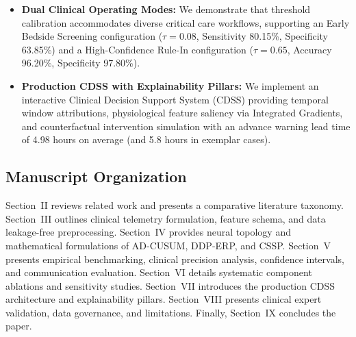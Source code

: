 \documentclass[journal,twocolumn,10pt]{IEEEtran}
\begin{document}
\begin{itemize}
\item \textbf{Dual Clinical Operating Modes:} We demonstrate that threshold calibration accommodates diverse critical care workflows, supporting an Early Bedside Screening configuration ($\tau=0.08$, Sensitivity 80.15\%, Specificity 63.85\%) and a High-Confidence Rule-In configuration ($\tau=0.65$, Accuracy 96.20\%, Specificity 97.80\%).
    \item \textbf{Production CDSS with Explainability Pillars:} We implement an interactive Clinical Decision Support System (CDSS) providing temporal window attributions, physiological feature saliency via Integrated Gradients, and counterfactual intervention simulation with an advance warning lead time of 4.98 hours on average (and 5.8 hours in exemplar cases).
\end{itemize}

\subsection{Manuscript Organization}
Section~II reviews related work and presents a comparative literature taxonomy. Section~III outlines clinical telemetry formulation, feature schema, and data leakage-free preprocessing. Section~IV provides neural topology and mathematical formulations of AD-CUSUM, DDP-ERP, and CSSP. Section~V presents empirical benchmarking, clinical precision analysis, confidence intervals, and communication evaluation. Section~VI details systematic component ablations and sensitivity studies. Section~VII introduces the production CDSS architecture and explainability pillars. Section~VIII presents clinical expert validation, data governance, and limitations. Finally, Section~IX concludes the paper.

\end{document}
